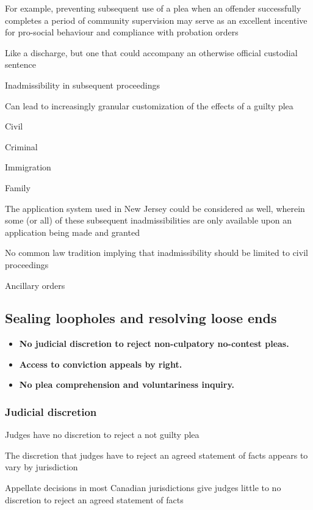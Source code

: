 For example, preventing subsequent use of a plea when an offender successfully completes a period of community supervision may serve as an excellent incentive for pro-social behaviour and compliance with probation orders

Like a discharge, but one that could accompany an otherwise official custodial sentence

Inadmissibility in subsequent proceedings

Can lead to increasingly granular customization of the effects of a guilty plea

Civil

Criminal

Immigration

Family

The application system used in New Jersey could be considered as well, wherein some (or all) of these subsequent inadmissibilities are only available upon an application being made and granted

No common law tradition implying that inadmissibility should be limited to civil proceedings

Ancillary orders

\subsection{Sealing loopholes and resolving loose ends}

\begin{itemize}
    \item \textbf{No judicial discretion to reject non-culpatory no-contest pleas.}
    \item \textbf{Access to conviction appeals by right.}
    \item \textbf{No plea comprehension and voluntariness inquiry.}
\end{itemize}

\subsubsection{Judicial discretion}

Judges have no discretion to reject a not guilty plea

The discretion that judges have to reject an agreed statement of facts appears to vary by jurisdiction

Appellate decisions in most Canadian jurisdictions give judges little to no discretion to reject an agreed statement of facts

